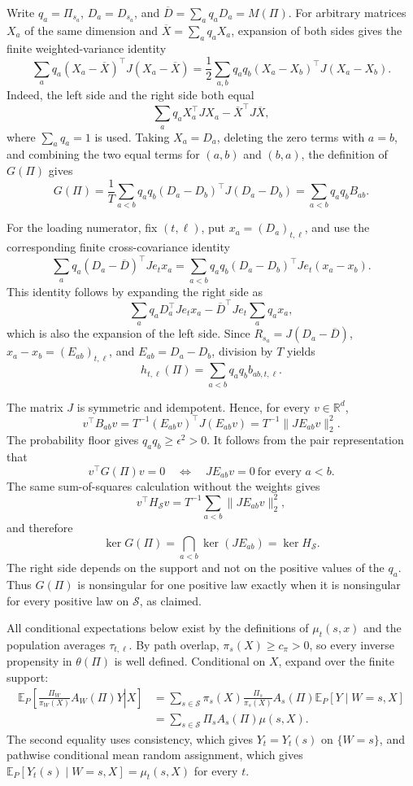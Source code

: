 Write \(q_a=\Pi_{s_a}\), \(D_a=D_{s_a}\), and \(\overline D=\sum_aq_aD_a=M(\Pi)\).  For arbitrary matrices \(X_a\) of the same dimension and \(\overline X=\sum_aq_aX_a\), expansion of both sides gives the finite weighted-variance identity
\[
 \sum_aq_a(X_a-\overline X)^{\top}J(X_a-\overline X)
 =\frac12\sum_{a,b}q_aq_b(X_a-X_b)^{\top}J(X_a-X_b).
\]
Indeed, the left side and the right side both equal
\[
 \sum_aq_aX_a^{\top}JX_a-\overline X^{\top}J\overline X,
\]
where \(\sum_aq_a=1\) is used.  Taking \(X_a=D_a\), deleting the zero terms with \(a=b\), and combining the two equal terms for \((a,b)\) and \((b,a)\), the definition of \(G(\Pi)\) gives
\[
 G(\Pi)
 =\frac1T\sum_{a<b}q_aq_b(D_a-D_b)^{\top}J(D_a-D_b)
 =\sum_{a<b}q_aq_bB_{ab}.
\]

For the loading numerator, fix \((t,\ell)\), put \(x_a=(D_a)_{t,\ell}\), and use the corresponding finite cross-covariance identity
\[
 \sum_aq_a(D_a-\overline D)^{\top}Je_tx_a
 =\sum_{a<b}q_aq_b(D_a-D_b)^{\top}Je_t(x_a-x_b).
\]
This identity follows by expanding the right side as
\[
 \sum_aq_aD_a^{\top}Je_tx_a-\overline D^{\top}Je_t\sum_aq_ax_a,
\]
which is also the expansion of the left side.  Since \(R_{s_a}=J(D_a-\overline D)\), \(x_a-x_b=(E_{ab})_{t,\ell}\), and \(E_{ab}=D_a-D_b\), division by \(T\) yields
\[
 h_{t,\ell}(\Pi)=\sum_{a<b}q_aq_bb_{ab,t,\ell}.
\]

The matrix \(J\) is symmetric and idempotent.  Hence, for every \(v\in\mathbb R^d\),
\[
 v^{\top}B_{ab}v
 =T^{-1}(E_{ab}v)^{\top}J(E_{ab}v)
 =T^{-1}\lVert JE_{ab}v\rVert_2^2.
\]
The probability floor gives \(q_aq_b\geq\epsilon^2>0\).  It follows from the pair representation that
\[
 v^{\top}G(\Pi)v=0
 \quad\Longleftrightarrow\quad
 JE_{ab}v=0\ \text{for every }a<b.
\]
The same sum-of-squares calculation without the weights gives
\[
 v^{\top}H_{\mathcal S}v
 =T^{-1}\sum_{a<b}\lVert JE_{ab}v\rVert_2^2,
\]
and therefore
\[
 \ker G(\Pi)=\bigcap_{a<b}\ker(JE_{ab})=\ker H_{\mathcal S}.
\]
The right side depends on the support and not on the positive values of the \(q_a\).  Thus \(G(\Pi)\) is nonsingular for one positive law exactly when it is nonsingular for every positive law on \(\mathcal S\), as claimed.

All conditional expectations below exist by the definitions of \(\mu_t(s,x)\) and the population averages \(\tau_{t,\ell}\).  By path overlap, \(\pi_s(X)\geq c_{\pi}>0\), so every inverse propensity in \(\theta(\Pi)\) is well defined.  Conditional on \(X\), expand over the finite support:
\[
 \begin{aligned}
 \mathbb E_P\!\left[\left.\frac{\Pi_W}{\pi_W(X)}A_W(\Pi)Y\right|X\right]
 &=\sum_{s\in\mathcal S}\pi_s(X)\frac{\Pi_s}{\pi_s(X)}A_s(\Pi)
       \mathbb E_P[Y\mid W=s,X]\\
 &=\sum_{s\in\mathcal S}\Pi_sA_s(\Pi)\mu(s,X).
 \end{aligned}
\]
The second equality uses consistency, which gives \(Y_t=Y_t(s)\) on \(\{W=s\}\), and pathwise conditional mean random assignment, which gives
\(
\mathbb E_P[Y_t(s)\mid W=s,X]=\mu_t(s,X)
\)
for every \(t\).

